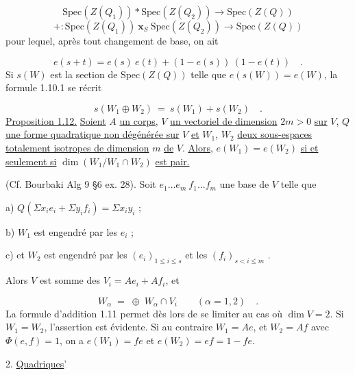 \begin{equation}\tag{1.11.1}
\mathrm{Spec}(Z(Q_1)) * \mathrm{Spec}(Z(Q_2)) \longrightarrow \mathrm{Spec}(Z(Q))
\end{equation}
\begin{equation*}
+ : \mathrm{Spec}(Z(Q_1))\ \mathbf{x}_S\ \mathrm{Spec}(Z(Q_2)) \longrightarrow \mathrm{Spec}(Z(Q))
\end{equation*}
pour lequel, après tout changement de base, on ait

\begin{equation*}
e(s + t) = e(s)\ e(t) + (1 - e(s))\ (1 - e(t)) \quad .
\end{equation*}
Si $s(W)$ est la section de $\mathrm{Spec}(Z(Q))$ telle que $e(s(W)) = e(W)$, la formule 1.10.1 se récrit

\begin{equation*}
s(W_1 \oplus W_2)\ =\ s(W_1) + s(W_2) \quad .
\end{equation*}
\underline{Proposition 1.12.} \underline{Soient} $A$ \underline{un corps,} $V$ \underline{un vectoriel de dimension} $2m > 0$ \underline{sur} $V$, $Q$ \underline{une forme quadratique non dégénérée sur} $V$ \underline{et} $W_1$, $W_2$ \underline{deux sous-espaces totalement isotropes de dimension} $m$ \underline{de} $V$. \underline{Alors}, $e(W_1) = e(W_2)$ \underline{si et seulement si} $\dim(W_1/W_1 \cap W_2)$ \underline{est pair.}



(Cf. Bourbaki Alg 9 \S 6 ex. 28). Soit $e_1 \dots e_m\ f_1 \dots f_m$ une base de $V$ telle que

a) \qquad $Q( \Sigma x_i e_i + \Sigma y_i f_i) = \Sigma x_i y_i$ ;

b) \qquad $W_1$ est engendré par les $e_i$ ;

c) \qquad et $W_2$ est engendré par les $(e_i)_{1 \leqslant i \leqslant s}$ et les $(f_i)_{s < i \leqslant m}$ .

Alors $V$ est somme des $V_i = A e_i + A f_i$, et

\begin{equation*}
W_\alpha \;=\; \oplus \; W_\alpha \cap V_i \qquad (\alpha = 1,2) \quad .
\end{equation*}
La formule d'addition 1.11 permet dès lors de se limiter au cas où $\dim V = 2$. Si $W_1 = W_2$, l'assertion est évidente. Si au contraire $W_1 = Ae$, et $W_2 = Af$ avec $\Phi(e,f) = 1$, on a $e(W_1) = fe$ et $e(W_2) = ef = 1 - fe$.


2. \underline{Quadriques}'

